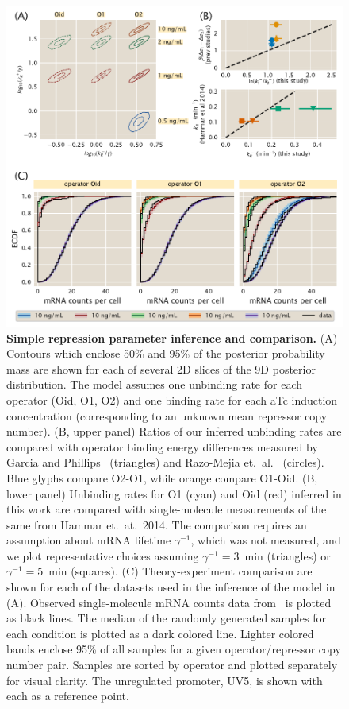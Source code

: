 \begin{figure}%
\centering
\includegraphics[width=\textwidth]{../figures/main/fig04.pdf}
\caption{\textbf{Simple repression parameter inference and comparison.}
(A) Contours which enclose 50\% and 95\% of the posterior probability mass are
shown for each of several 2D slices of the 9D posterior distribution. The model
assumes one unbinding rate for each operator (Oid, O1, O2) and one binding rate
for each aTc induction concentration (corresponding to an unknown mean repressor
copy number). (B, upper panel) Ratios of our inferred unbinding rates are
compared with operator binding energy differences measured by Garcia and
Phillips~\cite{Garcia2011a} (triangles) and Razo-Mejia et.\
al.~\cite{Razo-Mejia2018} (circles). Blue glyphs compare O2-O1, while orange
compare O1-Oid. (B, lower panel) Unbinding rates for O1 (cyan) and Oid (red)
inferred in this work are compared with single-molecule measurements of the same
from Hammar et.\ at.\ 2014. The comparison requires an assumption about mRNA
lifetime $\gamma^{-1}$, which was not measured, and we plot representative
choices assuming $\gamma^{-1}=3$~min (triangles) or $\gamma^{-1}=5$~min
(squares). (C) Theory-experiment comparison are shown for each of the datasets
used in the inference of the model in (A). Observed single-molecule mRNA counts
data from~\cite{Jones2014} is plotted as black lines. The median of the randomly
generated samples for each condition is plotted as a dark colored line. Lighter
colored bands enclose 95\% of all samples for a given operator/repressor copy
number pair. Samples are sorted by operator and plotted separately for visual
clarity. The unregulated promoter, UV5, is shown with each as a reference
point.}
\label{fig4:repressed_post_full}
\end{figure}

